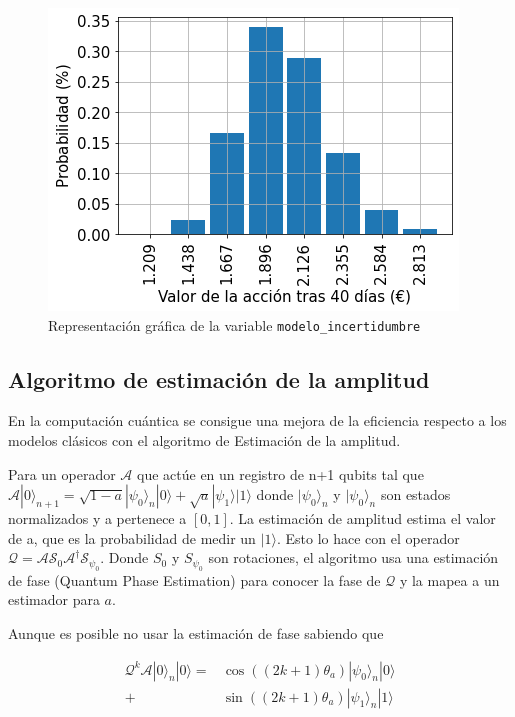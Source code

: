 \begin{figure}[h]
    \centering
    \includegraphics[width=\linewidth]{figures/notebooks/figure01.png}
    \caption{Representación gráfica de la variable \texttt{modelo\_incertidumbre}}
\end{figure}

\subsection{Algoritmo de estimación de la amplitud}
En la computación cuántica se consigue una mejora de la eficiencia respecto a los modelos clásicos con el algoritmo de Estimación de la amplitud.

Para un operador $\mathcal{A}$ que actúe en un registro de n+1 qubits tal que $\mathcal{A}|0\rangle_{n+1}=\sqrt{1-a}|\psi_0\rangle_n|0\rangle + \sqrt{a} |\psi_1\rangle|1\rangle$ donde $|\psi_0\rangle_n$ y $|\psi_0\rangle_n$ son estados normalizados y a pertenece a $[0,1]$. La estimación de amplitud estima el valor de a, que es la probabilidad de medir un $|1\rangle$. Esto lo hace con el operador $\mathcal{Q} = \mathcal{A}\mathcal{S}_0\mathcal{A}^\dagger\mathcal{S}_{\psi_0}$. Donde $S_0$ y $S_{\psi_0}$ son rotaciones, el algoritmo usa una estimación de fase (Quantum Phase Estimation) para conocer la fase de $\mathcal{Q}$ y la mapea a un estimador para $a$.  

Aunque es posible no usar la estimación de fase sabiendo que

\begin{align*}
\mathcal{Q}^k\mathcal{A}|0\rangle_n|0\rangle 
=& \cos\left(\left(2k+1\right)\theta_a\right)|\psi_0\rangle_n|0\rangle \\
+& \sin\left(\left(2k+1\right)\theta_a\right)|\psi_1\rangle_n|1\rangle
\end{align*}

